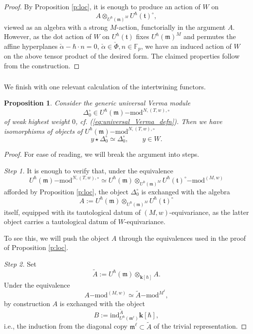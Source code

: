 \documentclass{amsart}
\newtheorem{Prop}[Thm]{Proposition}
\theoremstyle{definition}
\newtheorem{Rem}[Thm]{Remark}
\newcommand{\fm}{\mathfrak{m}}
\newcommand{\halpha}{\check{\alpha}}
\newcommand{\lmod}{\on{-mod}}
\newcommand{\sss}{\subsubsection{}}
\newcommand{\ft}{\mathfrak{t}}
\newcommand{\on}{\mathrm}
\newcommand{\bk}{\mathbf{k}}
\numberwithin{equation}{section}
\begin{document}
\begin{proof}By  Proposition \ref{p:loc}, it is enough to produce an action of $W$ on $$A  \otimes_{U^\hbar(\fm)^M} U^\hbar(\ft)^\circ,$$viewed as an algebra with a strong $M$-action, functorially in the argument $A$. However, as the dot action of $W$ on $U^\hbar(\ft)$ fixes $U^\hbar(\fm)^M$ and permutes the affine hyperplanes $\halpha - \hbar \cdot n 
= 0$, $\halpha \in \check{\Phi}, n \in \mathbb{F}_p$, we have an induced action of $W$ on the above tensor product of the desired form. The claimed properties follow from the construction. 
\end{proof}


\sss We finish with one relevant calculation of the intertwining functors.


{
\begin{Prop} \label{p:univverm} 
Consider the generic universal Verma module $$\Delta^\circ_{0} \in U^\hbar(\fm)\lmod^{N, (T, w), \circ}$$of weak highest weight $0$, cf. (\ref{eq:universal_Verma_defn}). Then we have isomorphisms of objects of  $U^\hbar(\fm)\lmod^{N, (T, w), \circ}$
$$y \star \Delta^\circ_{0} \simeq \Delta^\circ_{0}, \quad \quad y \in W.$$

\end{Prop}

\begin{proof} { For ease of reading, we will break the argument into steps. } 

{{\em Step 1.}} It is enough to verify that, under the equivalence 
$$U^\hbar(\fm)\lmod^{N, (T,w), \circ} \simeq U^{\hbar}(\fm)  \otimes_{U^\hbar(\fm)^M} U^\hbar(\ft)^\circ \lmod^{(M,w)}$$
afforded by Proposition \ref{p:loc}, the object $\Delta^\circ_0$ is exchanged with the algebra $$A := U^{\hbar}(\fm)  \otimes_{U^\hbar(\fm)^M} U^\hbar(\ft)^\circ$$itself, equipped with its tautological datum of $(M,w)$-equivariance, as the latter object carries a tautological datum of $W$-equivariance.  

To see this, we will push the object $A$ through the equivalences used in the proof of Proposition \ref{p:loc}. 

{{\em Step 2.}} Set $$\tilde{A}:=U^{\hbar}(\fm)  \otimes_{\bk[\hbar]} A.$$
Under the equivalence 
$$A \lmod^{(M,w)} \simeq  \tilde{A}\lmod^{M^\ell},$$by construction $A$ is exchanged with the object 
$$B := \on{ind}_{U^\hbar(\fm^\ell)}^{\tilde{A}} \bk[\hbar],$$
i.e., the induction from the diagonal copy { $\fm^\ell \subset \tilde{A}$} of the trivial representation. 


\end{proof}}
\end{document}
